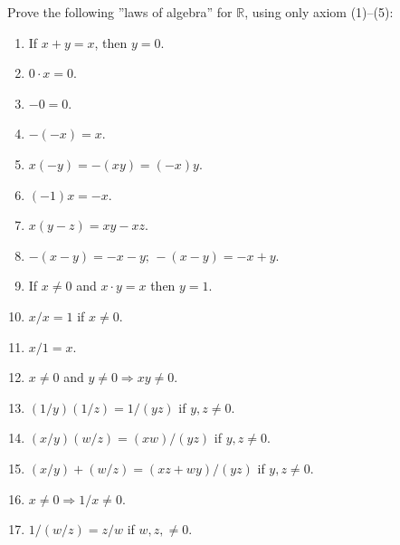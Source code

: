 \documentclass[a4paper,12pt]{article}
\begin{document}
\begin{exe}
	Prove the following ''laws of algebra'' for \( \mathbb{R} \),
	using only axiom (1)--(5):
	\begin{enumerate}
		\item
		      If \( x+y=x \),
		      then \( y=0 \).
		      
		\item
		      \( 0\cdot x =0 \).
		      
		\item
		      \( -0=0 \).
		      
		\item
		      \( -(-x)=x \).
		      
		\item
		      \( x(-y)=-(xy)=(-x)y \).
		      
		\item
		      \( (-1)x = -x\).
		      
		\item
		      \( x(y-z) = xy - xz \).
		      
		\item
		      \( -(x-y)=-x-y;\,-(x-y)=-x+y \).
		      
		\item
		      If
		      \( x \neq 0 \)
		      and
		      \( x \cdot y =x \)
		      then \( y=1 \).
		      
		\item
		      \( x/x = 1 \)
		      if \( x \neq 0 \).
		      
		\item
		      \( x/1=x \).
		      
		\item
		      \( x\neq 0 \)
		      and
		      \( y\neq 0 \Rightarrow xy \neq 0\).
		      
		\item
		      \( (1/y)(1/z)=1/(yz) \)
		      if \( y,z\neq 0 \).
		      
		\item
		      \( (x/y)(w/z)=(xw)/(yz) \)
		      if \( y,z\neq 0 \).
		      
		\item
		      \( (x/y)+(w/z)=(xz+wy)/(yz) \)
		      if \( y,z\neq 0 \).
		      
		\item
		      \( x \neq 0 \Rightarrow 1/x \neq 0 \).
		      
		\item
		      \( 1/(w/z) = z/w\)
		      if
		      \( w,z, \neq0 \).
		      

\end{enumerate}
\end{exe}
\end{document}
